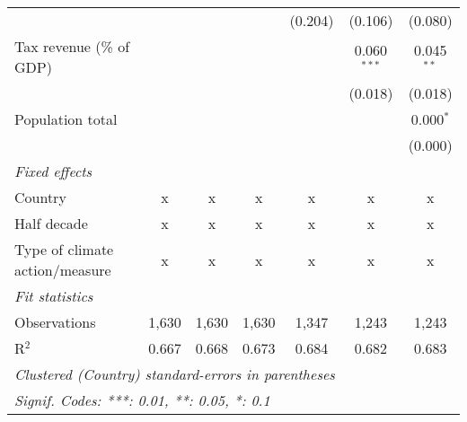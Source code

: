 \begin{tabular}{lcccccc}
                                                                  &         &         &                & (0.204)        & (0.106)        & (0.080)\\   
   Tax revenue (\% of GDP)                                        &         &         &                &                & 0.060$^{***}$  & 0.045$^{**}$\\   
                                                                  &         &         &                &                & (0.018)        & (0.018)\\   
   Population total                                               &         &         &                &                &                & 0.000$^{*}$\\   
                                                                  &         &         &                &                &                & (0.000)\\   
   \emph{Fixed effects}\\
   Country                                                        & x       & x       & x              & x              & x              & x\\  
   Half decade                                                    & x       & x       & x              & x              & x              & x\\  
   Type of climate action/measure                                 & x       & x       & x              & x              & x              & x\\  
   \midrule \emph{Fit statistics}\\
   Observations                                                   & 1,630   & 1,630   & 1,630          & 1,347          & 1,243          & 1,243\\  
   R$^2$                                                          & 0.667   & 0.668   & 0.673          & 0.684          & 0.682          & 0.683\\  
   \midrule
   \multicolumn{7}{l}{\emph{Clustered (Country) standard-errors in parentheses}}\\
   \multicolumn{7}{l}{\emph{Signif. Codes: ***: 0.01, **: 0.05, *: 0.1}}\\
\end{tabular}
\par\endgroup


